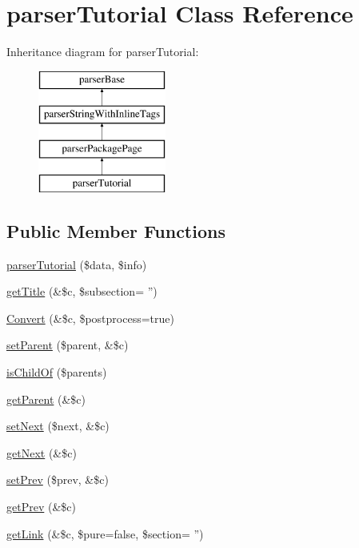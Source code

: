 \hypertarget{classparser_tutorial}{\section{parser\-Tutorial \-Class \-Reference}
\label{classparser_tutorial}
}
\-Inheritance diagram for parser\-Tutorial\-:\begin{figure}[H]
\begin{center}
\leavevmode
\includegraphics[height=4.000000cm]{classparser_tutorial}
\end{center}
\end{figure}
\subsection*{\-Public \-Member \-Functions}
\begin{DoxyCompactItemize}
\item 
\hyperlink{classparser_tutorial_a5ca6ad8066540ad59828568928ca0b0f}{parser\-Tutorial} (\$data, \$info)
\item 
\hyperlink{classparser_tutorial_a9b0e0931dff46cced2d42f370228190b}{get\-Title} (\&\$c, \$subsection= '')
\item 
\hyperlink{classparser_tutorial_a77af191d91c08203fe89824e3909a3f8}{\-Convert} (\&\$c, \$postprocess=true)
\item 
\hyperlink{classparser_tutorial_a3d99f53856ce59df35a38075c9cd7ab1}{set\-Parent} (\$parent, \&\$c)
\item 
\hyperlink{classparser_tutorial_a855fb06c4b54e5941f233854e2330350}{is\-Child\-Of} (\$parents)
\item 
\hyperlink{classparser_tutorial_ac086fbae4944903832bc040ababc668c}{get\-Parent} (\&\$c)
\item 
\hyperlink{classparser_tutorial_a6209c336bd872e60aca99c8f618c3108}{set\-Next} (\$next, \&\$c)
\item 
\hyperlink{classparser_tutorial_abb18bf55f733c1ff3b07e63689ef34a7}{get\-Next} (\&\$c)
\item 
\hyperlink{classparser_tutorial_a28544f1415376b549d71e4de4eeb5073}{set\-Prev} (\$prev, \&\$c)
\item 
\hyperlink{classparser_tutorial_a46cfd36e066c7e0eebb78d1f7c2683de}{get\-Prev} (\&\$c)
\item 
\hyperlink{classparser_tutorial_abde5186fad399ba5861f98950b038284}{get\-Link} (\&\$c, \$pure=false, \$section= '')
\end{DoxyCompactItemize}
